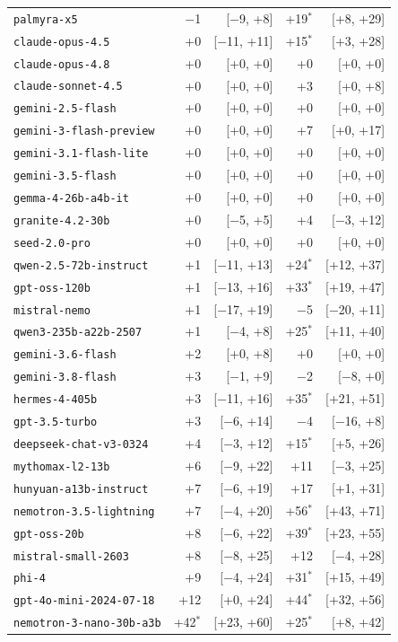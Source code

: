 {\begin{tabular}[t]{lrrrr}
\texttt{palmyra-x5} & $-$1 & [$-$9, +8] & +19$^*$ & [+8, +29] \\
\texttt{claude-opus-4.5} & +0 & [$-$11, +11] & +15$^*$ & [+3, +28] \\
\texttt{claude-opus-4.8} & +0 & [+0, +0] & +0 & [+0, +0] \\
\texttt{claude-sonnet-4.5} & +0 & [+0, +0] & +3 & [+0, +8] \\
\texttt{gemini-2.5-flash} & +0 & [+0, +0] & +0 & [+0, +0] \\
\texttt{gemini-3-flash-preview} & +0 & [+0, +0] & +7 & [+0, +17] \\
\texttt{gemini-3.1-flash-lite} & +0 & [+0, +0] & +0 & [+0, +0] \\
\texttt{gemini-3.5-flash} & +0 & [+0, +0] & +0 & [+0, +0] \\
\texttt{gemma-4-26b-a4b-it} & +0 & [+0, +0] & +0 & [+0, +0] \\
\texttt{granite-4.2-30b} & +0 & [$-$5, +5] & +4 & [$-$3, +12] \\
\texttt{seed-2.0-pro} & +0 & [+0, +0] & +0 & [+0, +0] \\
\texttt{qwen-2.5-72b-instruct} & +1 & [$-$11, +13] & +24$^*$ & [+12, +37] \\
\texttt{gpt-oss-120b} & +1 & [$-$13, +16] & +33$^*$ & [+19, +47] \\
\texttt{mistral-nemo} & +1 & [$-$17, +19] & $-$5 & [$-$20, +11] \\
\texttt{qwen3-235b-a22b-2507} & +1 & [$-$4, +8] & +25$^*$ & [+11, +40] \\
\texttt{gemini-3.6-flash} & +2 & [+0, +8] & +0 & [+0, +0] \\
\texttt{gemini-3.8-flash} & +3 & [$-$1, +9] & $-$2 & [$-$8, +0] \\
\texttt{hermes-4-405b} & +3 & [$-$11, +16] & +35$^*$ & [+21, +51] \\
\texttt{gpt-3.5-turbo} & +3 & [$-$6, +14] & $-$4 & [$-$16, +8] \\
\texttt{deepseek-chat-v3-0324} & +4 & [$-$3, +12] & +15$^*$ & [+5, +26] \\
\texttt{mythomax-l2-13b} & +6 & [$-$9, +22] & +11 & [$-$3, +25] \\
\texttt{hunyuan-a13b-instruct} & +7 & [$-$6, +19] & +17 & [+1, +31] \\
\texttt{nemotron-3.5-lightning} & +7 & [$-$4, +20] & +56$^*$ & [+43, +71] \\
\texttt{gpt-oss-20b} & +8 & [$-$6, +22] & +39$^*$ & [+23, +55] \\
\texttt{mistral-small-2603} & +8 & [$-$8, +25] & +12 & [$-$4, +28] \\
\texttt{phi-4} & +9 & [$-$4, +24] & +31$^*$ & [+15, +49] \\
\texttt{gpt-4o-mini-2024-07-18} & +12 & [+0, +24] & +44$^*$ & [+32, +56] \\
\texttt{nemotron-3-nano-30b-a3b} & +42$^*$ & [+23, +60] & +25$^*$ & [+8, +42] \\
\bottomrule
\end{tabular}}
